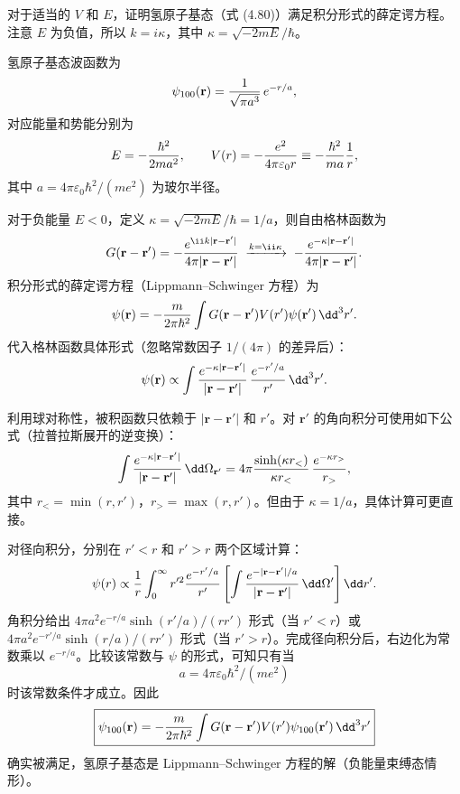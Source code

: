 \begin{question}
对于适当的 $V$ 和 $E$，证明氢原子基态（式 (4.80)）满足积分形式的薛定谔方程。注意 $E$ 为负值，所以 $k=i\kappa$，其中 $\kappa=\sqrt{-2mE}/\hbar$。

\par\smallskip
{}

\end{question}
\begin{solution}
氢原子基态波函数为
\[
\psi_{100}(\mathbf r)={1\over\sqrt{\pi a^{3}}}\,e^{-r/a},
\]
对应能量和势能分别为
\[
E=-{\hbar^2\over2ma^2},\qquad
V(r)=-{e^2\over4\pi\varepsilon_0 r}\equiv-{\hbar^2\over m a}{1\over r},
\]
其中 $a=4\pi\varepsilon_0\hbar^2/(me^2)$ 为玻尔半径。

对于负能量 $E<0$，定义 $\kappa=\sqrt{-2mE}/\hbar=1/a$，则自由格林函数为
\[
G(\mathbf r-\mathbf r')=-{e^{\ii k|\mathbf r-\mathbf r'|}\over4\pi|\mathbf r-\mathbf r'|}
\;\xrightarrow{k=\ii\kappa}\;
-{e^{-\kappa|\mathbf r-\mathbf r'|}\over4\pi|\mathbf r-\mathbf r'|}.
\]
积分形式的薛定谔方程（Lippmann--Schwinger 方程）为
\[
\psi(\mathbf r)=-{m\over2\pi\hbar^2}\int G(\mathbf r-\mathbf r')V(r')\psi(\mathbf r')\,\dd^3r'.
\]
代入格林函数具体形式（忽略常数因子 $1/(4\pi)$ 的差异后）：
\[
\psi(\mathbf r)\propto\int{e^{-\kappa|\mathbf r-\mathbf r'|}\over|\mathbf r-\mathbf r'|}\,{e^{-r'/a}\over r'}\,\dd^3r'.
\]

利用球对称性，被积函数只依赖于 $|\mathbf r-\mathbf r'|$ 和 $r'$。对 $\mathbf r'$ 的角向积分可使用如下公式（拉普拉斯展开的逆变换）：
\[
\int {e^{-\kappa|\mathbf r-\mathbf r'|}\over|\mathbf r-\mathbf r'|}\,\dd\Omega_{\mathbf r'}
=4\pi{\sinh(\kappa r_<)\over\kappa r_<}\,{e^{-\kappa r_>}\over r_>},
\]
其中 $r_<=\min(r,r')$，$r_>=\max(r,r')$。但由于 $\kappa=1/a$，具体计算可更直接。

对径向积分，分别在 $r'<r$ 和 $r'>r$ 两个区域计算：
\[
\psi(r)\propto{1\over r}\int_0^\infty r'^2{e^{-r'/a}\over r'}\left[\int {e^{-|\mathbf r-\mathbf r'|/a}\over|\mathbf r-\mathbf r'|}\,\dd\Omega'\right]\dd r'.
\]
角积分给出 $4\pi a^2 e^{-r/a}\sinh(r'/a)/(rr')$ 形式（当 $r'<r$）或 $4\pi a^2 e^{-r'/a}\sinh(r/a)/(rr')$ 形式（当 $r'>r$）。完成径向积分后，右边化为常数乘以 $e^{-r/a}$。比较该常数与 $\psi$ 的形式，可知只有当
\[
a=4\pi\varepsilon_0\hbar^2/(me^2)
\]
时该常数条件才成立。因此
\[
\boxed{\psi_{100}(\mathbf r)=-{m\over2\pi\hbar^2}\int G(\mathbf r-\mathbf r')V(r')\psi_{100}(\mathbf r')\,\dd^3r'}
\]
确实被满足，氢原子基态是 Lippmann--Schwinger 方程的解（负能量束缚态情形）。
\end{solution}

